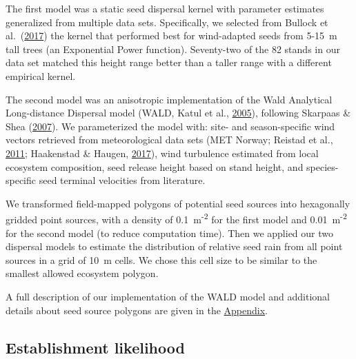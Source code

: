 \documentclass[
]{article}
\begin{document}
The first model was a static seed dispersal kernel with parameter estimates generalized from multiple data sets.
Specifically, we selected from Bullock et al.~(\protect\hyperlink{ref-bullockSynthesisEmpiricalPlant2017}{2017}) the kernel that performed best for wind-adapted seeds from 5-15~m tall trees (an Exponential Power function).
Seventy-two of the 82 stands in our data set matched this height range better than a taller range with a different empirical kernel.

The second model was an anisotropic implementation of the Wald Analytical Long-distance Dispersal model (WALD, Katul et al., \protect\hyperlink{ref-katulMechanisticAnalyticalModels2005}{2005}), following Skarpaas \& Shea (\protect\hyperlink{ref-skarpaasDispersalPatternsDispersal2007}{2007}).
We parameterized the model with: site- and season-specific wind vectors retrieved from meteorological data sets (MET Norway; Reistad et al., \protect\hyperlink{ref-reistadHighresolutionHindcastWind2011}{2011}; Haakenstad \& Haugen, \protect\hyperlink{ref-haakenstad15yearHighResolution2017}{2017}), wind turbulence estimated from local ecosystem composition, seed release height based on stand height, and species-specific seed terminal velocities from literature.

We transformed field-mapped polygons of potential seed sources into hexagonally gridded point sources, with a density of 0.1~m\textsuperscript{-2} for the first model and 0.01~m\textsuperscript{-2} for the second model (to reduce computation time).
Then we applied our two dispersal models to estimate the distribution of relative seed rain from all point sources in a grid of 10~m cells.
We chose this cell size to be similar to the smallest allowed ecosystem polygon.

A full description of our implementation of the WALD model and additional details about seed source polygons are given in the \protect\hyperlink{appendix}{Appendix}.

\hypertarget{establishment-likelihood}{%
\subsection{Establishment likelihood}\label{establishment-likelihood}}
\end{document}

